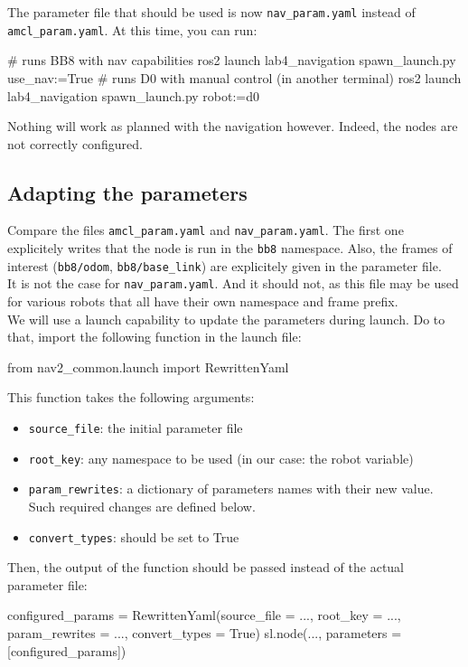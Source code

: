 \documentclass{ecnreport}
\begin{document}
The parameter file that should be used is now \texttt{nav\_param.yaml} instead of \texttt{amcl\_param.yaml}. At this time, you can run:
\begin{bashcodelarge}
# runs BB8 with nav capabilities
ros2 launch lab4_navigation spawn_launch.py use_nav:=True
# runs D0 with manual control (in another terminal)
ros2 launch lab4_navigation spawn_launch.py robot:=d0
 \end{bashcodelarge}
 Nothing will work as planned with the navigation however. Indeed, the nodes are not correctly configured.

\subsection{Adapting the parameters}

Compare the files \texttt{amcl\_param.yaml} and \texttt{nav\_param.yaml}. The first one explicitely writes that the node is run in the \texttt{bb8} namespace. Also, the frames of interest (\texttt{bb8/odom}, \texttt{bb8/base\_link}) are explicitely given in the parameter file.\\

It is not the case for \texttt{nav\_param.yaml}. And it should not, as this file may be used for various robots that all have their own namespace and frame prefix.\\
We will use a launch capability to update the parameters during launch. Do to that, import the following function in the launch file:
\begin{pythoncodelarge}
from nav2_common.launch import RewrittenYaml
\end{pythoncodelarge}

This function takes the following arguments:
\begin{itemize}
\item \texttt{source\_file}: the initial parameter file
\item \texttt{root\_key}: any namespace to be used (in our case: the robot variable)
\item \texttt{param\_rewrites}: a dictionary of parameters names with their new value. Such required changes are defined below.
\item \texttt{convert\_types}: should be set to True
\end{itemize}

Then, the output of the function should be passed instead of the actual parameter file:
\begin{pythoncodelarge}
configured_params = RewrittenYaml(source_file = ...,
                                    root_key = ..., 
                                    param_rewrites = ...,
                                    convert_types = True)
sl.node(..., parameters = [configured_params])
\end{pythoncodelarge}
\end{document}
